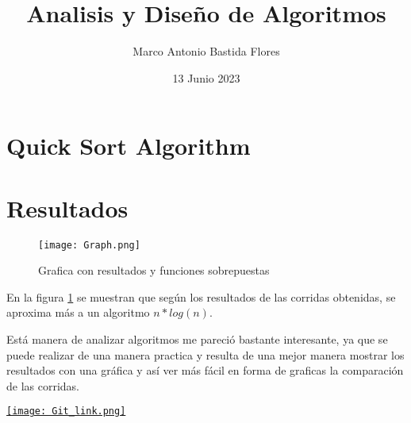 \documentclass{article}
\title{Analisis y Diseño de Algoritmos}
\author{Marco Antonio Bastida Flores}
\date{13 Junio 2023}
\begin{document}
\maketitle

\section{Quick Sort Algorithm}

\vspace{5mm} %



\vspace{5mm} %

\section{Resultados}

\vspace{5mm} %

\begin{figure}[ht]
    \centering
    \texttt{[image: Graph.png]}
    \caption{Grafica con resultados y funciones sobrepuestas}
    \label{fig:grafica}
\end{figure}

\vspace{15mm} %

En la figura \ref{fig:grafica} se muestran que según los resultados de las corridas obtenidas, se aproxima más a un algoritmo \begin{math} n*log(n) \end{math}.

Está manera de analizar algoritmos me pareció bastante interesante, ya que se puede realizar de una manera practica y resulta de una mejor manera mostrar los resultados con una gráfica y así ver más fácil en forma de graficas la comparación de las corridas.

\vspace{15mm} %

\href{https://github.com/enganthony18/Algorithms}{\texttt{[image: Git\_link.png]}}
\end{document}
